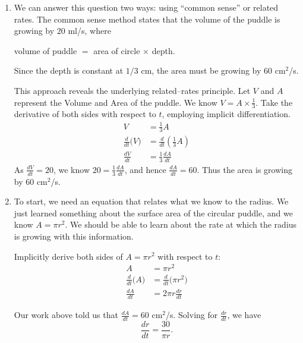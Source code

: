{\begin{enumerate}
\item We can answer this question two ways: using ``common sense'' or related rates. The common sense method states that the volume of the puddle is growing by $20$ ml/s, where 
	\begin{center} volume of puddle $=$ area of circle $\times$ depth.\end{center}
Since the depth is constant at $1/3$ cm, the area must be growing by 60 cm$^2$/s.

This approach reveals the underlying related--rates principle. Let $V$ and $A$ represent the Volume and Area of the puddle. We know $V= A\times \frac13$. Take the derivative of both sides with respect to $t$, employing implicit differentiation.
\begin{align*}
V &= \frac13A\\
\frac{d}{dt}\big(V\big) &= \frac{d}{dt}\left(\frac13A\right)\\
\frac{dV}{dt} &=	\frac13\frac{dA}{dt}
\end{align*} 
As $\frac{dV}{dt} = 20$, we know $20 = \frac13\frac{dA}{dt}$, and hence $\frac{dA}{dt} = 60$. Thus the area is growing by 60 cm$^2$/s.

\item		To start, we need an equation that relates what we know to the radius. We just learned something about the surface area of the circular puddle, and we know $A = \pi r^2$. We should be able to learn about the rate at which the radius is growing with this information. 

Implicitly derive both sides of $A=\pi r^2$ with respect to $t$:
\begin{align*}
	A 	&= \pi r^2 \\
	\frac{d}{dt}\big(A\big) &= \frac{d}{dt}\big(\pi r^2\big)\\
	\frac{dA}{dt} &= 2\pi r\frac{dr}{dt}
\end{align*}

Our work above told us that $\frac{dA}{dt} = 60$ cm$^2$/s. Solving for $\frac{dr}{dt}$, we have 
\[
\frac{dr}{dt} = \frac{30}{\pi r}.
\]


\end{enumerate}}
